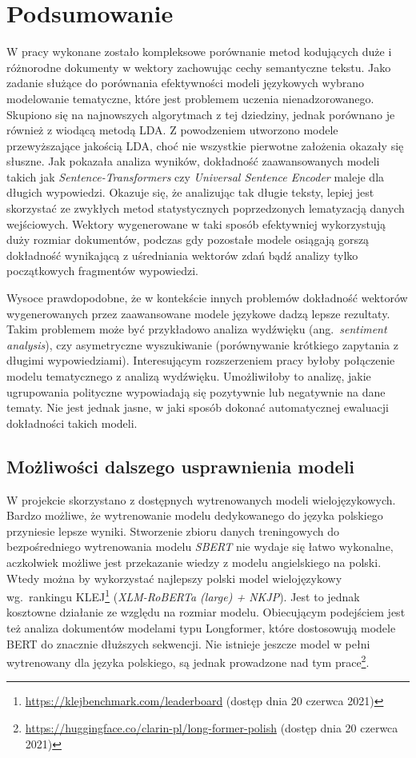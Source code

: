 
\chapter{Podsumowanie}
	W pracy wykonane zostało kompleksowe porównanie metod kodujących duże i różnorodne dokumenty w wektory zachowując cechy semantyczne tekstu.
	Jako zadanie służące do porównania efektywności modeli językowych wybrano modelowanie tematyczne, które jest problemem uczenia nienadzorowanego.
	Skupiono się na najnowszych algorytmach z tej dziedziny, jednak porównano je również z wiodącą metodą LDA\@.
	Z powodzeniem utworzono modele przewyższające jakością LDA, choć nie wszystkie pierwotne założenia okazały się słuszne.
	Jak pokazała analiza wyników, dokładność zaawansowanych modeli takich jak \emph{Sentence-Transformers} czy \emph{Universal Sentence Encoder}
		maleje dla długich wypowiedzi.
	Okazuje się, że analizując tak długie teksty, lepiej jest skorzystać ze zwykłych metod statystycznych poprzedzonych lematyzacją danych wejściowych.
	Wektory wygenerowane w taki sposób efektywniej wykorzystują duży rozmiar dokumentów,
		podczas gdy pozostałe modele osiągają gorszą dokładność wynikającą z uśredniania wektorów zdań bądź analizy tylko początkowych fragmentów wypowiedzi.

	Wysoce prawdopodobne, że w kontekście innych problemów dokładność wektorów wygenerowanych przez zaawansowane modele językowe dadzą lepsze rezultaty.
	Takim problemem może być przykładowo analiza wydźwięku (ang.\ \emph{sentiment analysis}), czy asymetryczne wyszukiwanie (porównywanie krótkiego zapytania z długimi wypowiedziami).
	Interesującym rozszerzeniem pracy byłoby połączenie modelu tematycznego z analizą wydźwięku.
	Umożliwiłoby to analizę, jakie ugrupowania polityczne wypowiadają się pozytywnie lub negatywnie na dane tematy.
	Nie jest jednak jasne, w jaki sposób dokonać automatycznej ewaluacji dokładności takich modeli.


	\section{Możliwości dalszego usprawnienia modeli}
		W projekcie skorzystano z dostępnych wytrenowanych modeli wielojęzykowych.
		Bardzo możliwe, że wytrenowanie modelu dedykowanego do języka polskiego przyniesie lepsze wyniki.
		Stworzenie zbioru danych treningowych do bezpośredniego wytrenowania modelu \emph{SBERT} nie wydaje się łatwo wykonalne,
			aczkolwiek możliwe jest przekazanie wiedzy z modelu angielskiego na polski.
		Wtedy można by wykorzystać najlepszy polski model wielojęzykowy wg.~rankingu KLEJ\footnote{\url{https://klejbenchmark.com/leaderboard} (dostęp dnia 20 czerwca 2021)} (\emph{XLM-RoBERTa (large) + NKJP}).
		Jest to jednak kosztowne działanie ze względu na rozmiar modelu.
		Obiecującym podejściem jest też analiza dokumentów modelami typu Longformer\cite{Longformer}, które dostosowują modele BERT do znacznie dłuższych sekwencji.
		Nie istnieje jeszcze model w pełni wytrenowany dla języka polskiego, są jednak prowadzone nad tym prace\footnote{\url{https://huggingface.co/clarin-pl/long-former-polish} (dostęp dnia 20 czerwca 2021)}. 


